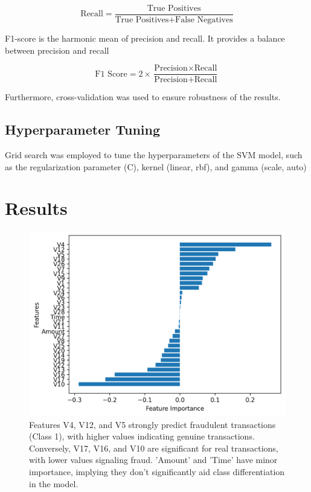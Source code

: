 \documentclass[11pt,article,oneside]{article}
\begin{document}
\[
\text{Recall} = \frac{\text{True Positives}}{\text{True Positives} + \text{False Negatives}}
\]

F1-score is the harmonic mean of precision and recall. It provides a balance between precision and recall

\[
\text{F1 Score} = 2 \times \frac{\text{Precision} \times \text{Recall}}{\text{Precision} + \text{Recall}}
\]


Furthermore, cross-validation was used to ensure robustness of the results.
    
\subsection{Hyperparameter Tuning}
Grid search was employed to tune the hyperparameters of the SVM model, such as the regularization parameter (C), 
kernel (linear, rbf), and gamma (scale, auto)
    


\section{Results}

\begin{figure}[!htb]
    \centering
    \includegraphics[width=0.7\linewidth]{feature_importance.png}
    \caption{Features V4, V12, and V5 strongly predict fraudulent transactions (Class 1), with higher values indicating genuine
     transactions. Conversely, V17, V16, and V10 are significant for real transactions, with lower values signaling fraud. 
     'Amount' and 'Time' have minor importance, implying they don't significantly aid class differentiation in the model.}
    \label{Fig 1: Feature Importance}
\end{figure}
\end{document}
